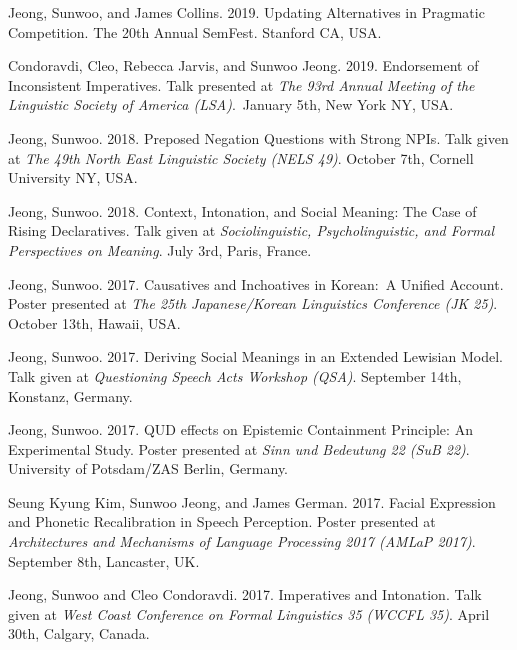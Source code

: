 \documentclass[letterpaper]{article}
\renewenvironment{itemize}{
  \begin{list}{}{
    \setlength{\leftmargin}{1.5em}
  }
}{
  \end{list}
}
\begin{document}
\begin{itemize}

\item Jeong, Sunwoo, and James Collins. 2019. Updating Alternatives in Pragmatic Competition. The 20th Annual SemFest. Stanford CA, USA.

\item Condoravdi, Cleo, Rebecca Jarvis, and Sunwoo Jeong. 2019. Endorsement of Inconsistent Imperatives. Talk presented at \emph{The 93rd Annual Meeting of the Linguistic Society of America (LSA)}.\ January 5th, New York NY, USA.

\item Jeong, Sunwoo. 2018. Preposed Negation Questions with Strong NPIs. Talk given at \emph{The 49th North East Linguistic Society (NELS 49)}. October 7th, Cornell University NY, USA.

\item Jeong, Sunwoo. 2018. Context, Intonation, and Social Meaning: The Case of Rising Declaratives. Talk given at \emph{Sociolinguistic, Psycholinguistic, and Formal Perspectives on Meaning}. July 3rd, Paris, France.

\item Jeong, Sunwoo. 2017. Causatives and Inchoatives in Korean:\ A Unified Account. Poster presented at {\it The 25th Japanese/Korean Linguistics Conference (JK 25)}. October 13th, Hawaii, USA.

\item Jeong, Sunwoo. 2017. Deriving Social Meanings in an Extended Lewisian Model. Talk given at {\it Questioning Speech Acts Workshop (QSA)}. September 14th, Konstanz, Germany.

\item Jeong, Sunwoo. 2017. QUD effects on Epistemic Containment Principle: An Experimental Study. Poster presented at {\it Sinn und Bedeutung 22 (SuB 22)}. University of Potsdam/ZAS Berlin, Germany.

\item Seung Kyung Kim, Sunwoo Jeong, and James German. 2017. Facial Expression and Phonetic Recalibration in Speech Perception. Poster presented at {\it Architectures and Mechanisms of Language Processing 2017 (AMLaP 2017)}. September 8th, Lancaster, UK.

\item Jeong, Sunwoo and Cleo Condoravdi. 2017. Imperatives and Intonation. Talk given at {\it West Coast Conference on Formal Linguistics 35 (WCCFL 35)}. April 30th, Calgary, Canada.


\end{itemize}
\end{document}
